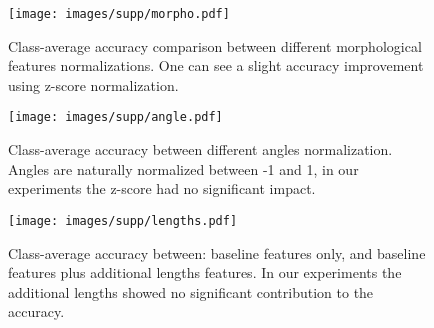 \documentclass[10pt,twocolumn,letterpaper]{article}
\begin{document}
\begin{figure}
  \centering
  \texttt{[image: images/supp/morpho.pdf]}
  \caption{Class-average accuracy comparison between different morphological features normalizations. One can see a slight accuracy improvement using z-score normalization.}
  \label{fig:morph}
\end{figure}

\begin{figure}
  \centering
  \texttt{[image: images/supp/angle.pdf]}
  \caption{Class-average accuracy between different angles normalization. Angles are naturally normalized between -1 and 1, in our experiments the z-score had no significant impact.}
  \label{fig:angle}
\end{figure}

\begin{figure}
  \centering
  \texttt{[image: images/supp/lengths.pdf]}
  \caption{Class-average accuracy between: baseline features only, and baseline features plus additional lengths features. In our experiments the additional lengths showed no significant contribution to the accuracy.}
  \label{fig:lengths}
\end{figure}
\end{document}
